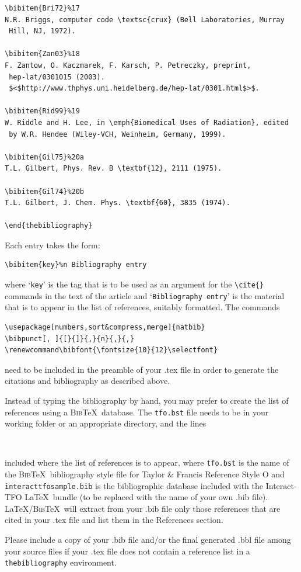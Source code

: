 \documentclass[]{interact}
\renewcommand\bibfont{\fontsize{10}{12}\selectfont}%
\theoremstyle{plain}%
\theoremstyle{definition}
\theoremstyle{remark}
\begin{document}
\begin{verbatim}
\bibitem{Bri72}%17
N.R. Briggs, computer code \textsc{crux} (Bell Laboratories, Murray
 Hill, NJ, 1972).

\bibitem{Zan03}%18
F. Zantow, O. Kaczmarek, F. Karsch, P. Petreczky, preprint,
 hep-lat/0301015 (2003).
 $<$http://www.thphys.uni.heidelberg.de/hep-lat/0301.html$>$.

\bibitem{Rid99}%19
W. Riddle and H. Lee, in \emph{Biomedical Uses of Radiation}, edited
 by W.R. Hendee (Wiley-VCH, Weinheim, Germany, 1999).

\bibitem{Gil75}%20a
T.L. Gilbert, Phys. Rev. B \textbf{12}, 2111 (1975).

\bibitem{Gil74}%20b
T.L. Gilbert, J. Chem. Phys. \textbf{60}, 3835 (1974).

\end{thebibliography}
\end{verbatim}
\bigskip
\noindent Each entry takes the form:
\begin{verbatim}
\bibitem{key}%n Bibliography entry
\end{verbatim}
where `\texttt{key}' is the tag that is to be used as an argument for the \verb"\cite{}" commands in the text of the article and `\texttt{Bibliography entry}' is the material that is to appear in the list of references, suitably formatted. The commands
\begin{verbatim}
\usepackage[numbers,sort&compress,merge]{natbib}
\bibpunct[, ]{[}{]}{,}{n}{,}{,}
\renewcommand\bibfont{\fontsize{10}{12}\selectfont}
\end{verbatim}
need to be included in the preamble of your .tex file in order to generate the citations and bibliography as described above.

Instead of typing the bibliography by hand, you may prefer to create the list of references using a \textsc{Bib}\TeX\ database. The \texttt{tfo.bst} file needs to be in your working folder or an appropriate directory, and the lines
\begin{verbatim}


\end{verbatim}
included where the list of references is to appear, where \texttt{tfo.bst} is the name of the \textsc{Bib}\TeX\ bibliography style file for Taylor \& Francis Reference Style O and \texttt{interacttfosample.bib} is the bibliographic database included with the \textsf{Interact}-TFO \LaTeX\ bundle (to be replaced with the name of your own .bib file). \LaTeX/\textsc{Bib}\TeX\ will extract from your .bib file only those references that are cited in your .tex file and list them in the References section.

Please include a copy of your .bib file and/or the final generated .bbl file among your source files if your .tex file does not contain a reference list in a \texttt{thebibliography} environment.
\end{document}
